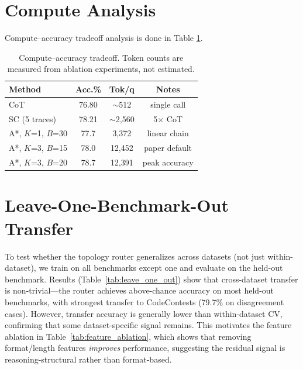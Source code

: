 \documentclass[11pt]{article}
\begin{document}
{\section{Compute Analysis}
\label{app:compute}
Compute--accuracy tradeoff analysis is done in Table \ref{tab:compute}.
\begin{table}[ht]
\centering
\small
\begin{tabular}{lccc}
\toprule
\textbf{Method} & \textbf{Acc.\%} & \textbf{Tok/q} & \textbf{Notes} \\
\midrule
CoT & 76.80 & $\sim$512 & single call \\
SC (5 traces) & 78.21 & $\sim$2,560 & 5$\times$ CoT \\
A*, $K$=1, $B$=30 & 77.7 & 3,372 & linear chain \\
A*, $K$=3, $B$=15 & 78.0 & 12,452 & paper default \\
A*, $K$=3, $B$=20 & 78.7 & 12,391 & peak accuracy \\
\bottomrule
\end{tabular}
\caption{Compute--accuracy tradeoff. Token counts are measured from ablation experiments, not estimated.}
\label{tab:compute}
\end{table}

\section{Leave-One-Benchmark-Out Transfer}
\label{app:leave_one_out}

To test whether the topology router generalizes across datasets (not just within-dataset), we train on all benchmarks except one and evaluate on the held-out benchmark. Results (Table~\ref{tab:leave_one_out}) show that cross-dataset transfer is non-trivial---the router achieves above-chance accuracy on most held-out benchmarks, with strongest transfer to CodeContests (79.7\% on disagreement cases). However, transfer accuracy is generally lower than within-dataset CV, confirming that some dataset-specific signal remains. This motivates the feature ablation in Table~\ref{tab:feature_ablation}, which shows that removing format/length features \emph{improves} performance, suggesting the residual signal is reasoning-structural rather than format-based.

}
\end{document}
